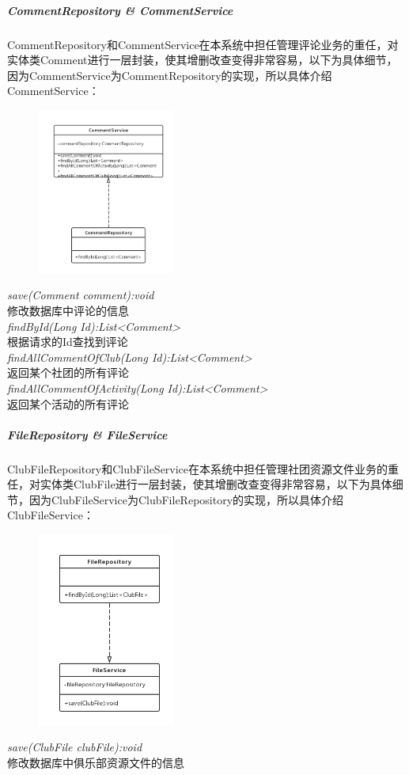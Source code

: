 \documentclass[UTF8]{ctexart}
\begin{document}
\subparagraph{CommentRepository \& CommentService}
CommentRepository和CommentService在本系统中担任管理评论业务的重任，对实体类Comment进行一层封装，使其增删改查变得非常容易，以下为具体细节，因为CommentService为CommentRepository的实现，所以具体介绍CommentService：
\newline
\begin{figure}[H]
\centering
\includegraphics[width = 0.4\textwidth]{comment-rs.png}
\end{figure}
\begin{center}
\emph{save(Comment comment):void}\\
修改数据库中评论的信息\\
\emph{findById(Long Id):List<Comment>}\\
根据请求的Id查找到评论\\
\emph{findAllCommentOfClub(Long Id):List<Comment>}\\
返回某个社团的所有评论\\
\emph{findAllCommentOfActivity(Long Id):List<Comment>}\\
返回某个活动的所有评论
\end{center}

\subparagraph{FileRepository \& FileService}
ClubFileRepository和ClubFileService在本系统中担任管理社团资源文件业务的重任，对实体类ClubFile进行一层封装，使其增删改查变得非常容易，以下为具体细节，因为ClubFileService为ClubFileRepository的实现，所以具体介绍ClubFileService：
\newline
\begin{figure}[H]
\centering
\includegraphics[width = 0.4\textwidth]{clubfile-rs.png}
\end{figure}
\begin{center}
\emph{save(ClubFile clubFile):void}\\
修改数据库中俱乐部资源文件的信息
\end{center}
\end{document}
